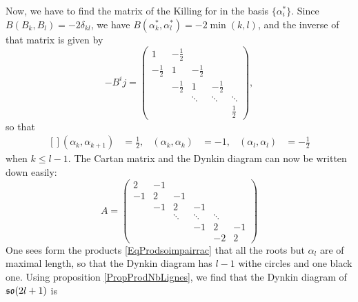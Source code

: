 Now, we have to find the matrix of the Killing for in the basis $\{ \alpha_i^* \}$. Since $B(B_k,B_l)=-2\delta_{kl}$, we have $B(\alpha_k^*,\alpha_l^*)=-2\min(k,l)$, and the inverse of that matrix is given by
\begin{equation}
	-B^ij=
	\begin{pmatrix}
		1		& -\frac{ 1 }{2}\\
		-\frac{ 1 }{2}	& 1			& -\frac{ 1 }{2}\\
		& -\frac{ 1 }{2}	& 1			&-\frac{ 1 }{2}\\
		&& \ddots		& \ddots		& \ddots\\
		&&			&			&	\frac{ 1 }{2}
	\end{pmatrix},
\end{equation}
so that
\begin{equation}		\label{EqProdsoimpairrac}
	\begin{aligned}[]
		(\alpha_k,\alpha_{k+1})&=\frac{ 1 }{2},	&	(\alpha_k,\alpha_k)&=-1,	&(\alpha_l,\alpha_l)&=-\frac{ 1 }{2}
	\end{aligned}
\end{equation}
when $k\leq l-1$. The Cartan matrix and the Dynkin diagram can now be written down easily:
\begin{equation}		\label{EqCartanSOimpair}
	A=
	\begin{pmatrix}
		2	& -1\\
		-1	& 2	& -1\\
		& -1	& 2		& -1\\
		&	& \ddots	& \ddots	& \ddots\\
		&	&		& -1		& 2	& -1\\
		&	&		& 		& -2	& 2
	\end{pmatrix}
\end{equation}
One sees form the products \eqref{EqProdsoimpairrac} that all the roots but $\alpha_l$ are of maximal length, so that the Dynkin diagram has $l-1$ withe circles and one black one. Using proposition \ref{PropProdNbLignes}, we find that the Dynkin diagram of $\operatorname{\mathfrak{so}}(2l+1)$ is
%	
\begin{equation}
   
\end{equation}

